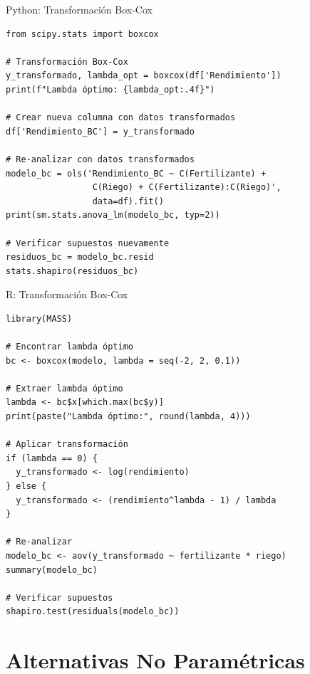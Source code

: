 \documentclass[aspectratio=169]{beamer}
\begin{document}
\begin{frame}[fragile]{Python: Transformación Box-Cox}
\small
\begin{verbatim}
from scipy.stats import boxcox

# Transformación Box-Cox
y_transformado, lambda_opt = boxcox(df['Rendimiento'])
print(f"Lambda óptimo: {lambda_opt:.4f}")

# Crear nueva columna con datos transformados
df['Rendimiento_BC'] = y_transformado

# Re-analizar con datos transformados
modelo_bc = ols('Rendimiento_BC ~ C(Fertilizante) + 
                 C(Riego) + C(Fertilizante):C(Riego)',
                 data=df).fit()
print(sm.stats.anova_lm(modelo_bc, typ=2))

# Verificar supuestos nuevamente
residuos_bc = modelo_bc.resid
stats.shapiro(residuos_bc)
\end{verbatim}
\end{frame}

\begin{frame}[fragile]{R: Transformación Box-Cox}
\small
\begin{verbatim}
library(MASS)

# Encontrar lambda óptimo
bc <- boxcox(modelo, lambda = seq(-2, 2, 0.1))

# Extraer lambda óptimo
lambda <- bc$x[which.max(bc$y)]
print(paste("Lambda óptimo:", round(lambda, 4)))

# Aplicar transformación
if (lambda == 0) {
  y_transformado <- log(rendimiento)
} else {
  y_transformado <- (rendimiento^lambda - 1) / lambda
}

# Re-analizar
modelo_bc <- aov(y_transformado ~ fertilizante * riego)
summary(modelo_bc)

# Verificar supuestos
shapiro.test(residuals(modelo_bc))
\end{verbatim}
\end{frame}

\section{Alternativas No Paramétricas}
\end{document}
